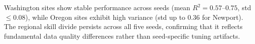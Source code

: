 \documentclass[toxins,article,submit,moreauthors]{Definitions/mdpi}
\begin{document}
Washington sites show stable performance across seeds (mean $R^2 = 0.57$--$0.75$, std $\leq 0.08$), while Oregon sites exhibit high variance (std up to 0.36 for Newport). The regional skill divide persists across all five seeds, confirming that it reflects fundamental data quality differences rather than seed-specific tuning artifacts.



\end{document}

